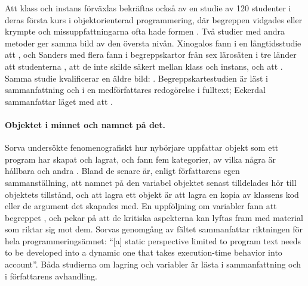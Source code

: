 Att klass och instans förväxlas bekräftas också av en studie av 120
studenter i deras första kurs i objektorienterad programmering, där
begreppen vidgades eller krympte och missuppfattningarna ofta hade formen
.  Två studier med
andra metoder ger samma bild av den översta nivån.
Xinogalos fann i en långtidsstudie att
, och
Sanders med flera fann i begreppskartor från sex
lärosäten i tre länder att studenterna , att de inte skilde säkert mellan klass och instans,
och att .  Samma studie kvalificerar en
äldre bild: .  Begreppskartestudien är läst i sammanfattning och i en
medförfattares redogörelse i fulltext\autocite[41--43]{Boustedt2010PhD};
Eckerdal sammanfattar läget med att .

\paragraph{Objektet i minnet och namnet på det.}
Sorva undersökte fenomenografiskt hur nybörjare uppfattar
objekt som ett program har skapat och lagrat, och fann fem kategorier,
av vilka några är hållbara och andra .  Bland de senare är, enligt författarens egen sammanställning,
att namnet på den variabel objektet senast tilldelades hör till objektets
tillstånd, och att lagra ett objekt är att lagra en kopia av klassens kod
eller de argument det skapades med\autocite[365]{Sorva2012VPS}.  En
uppföljning om variabler fann att begreppet
, och
pekar på att de kritiska aspekterna kan lyftas fram med material som
riktar sig mot dem.  Sorvas genomgång av fältet\autocite[102]{Sorva2012VPS}
sammanfattar riktningen för hela programmeringsämnet: \enquote{[a] static
perspective limited to program text needs to be developed into a dynamic
one that takes execution-time behavior into account}.  Båda studierna om
lagring och variabler är lästa i sammanfattning och i författarens
avhandling.

